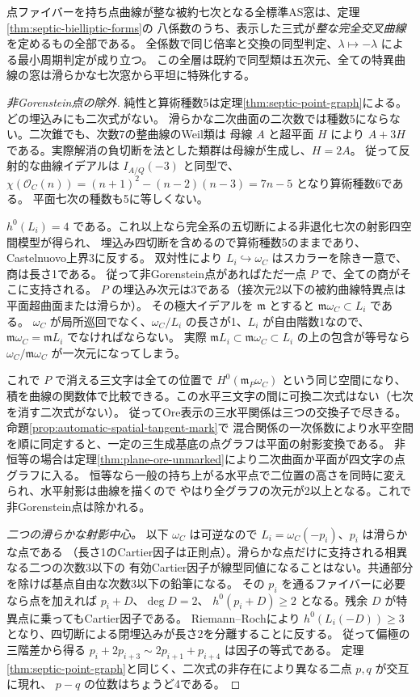 \begin{theorem}\label{thm:integral-septic-boundary}
点ファイバーを持ち点曲線が整な被約七次となる全標準AS窓は、定理\ref{thm:septic-bielliptic-forms}の
八係数のうち、表示した三式が\emph{整な完全交叉曲線}を定めるもの全部である。
全係数で同じ倍率と交換の同型判定、$\lambda\mapsto-\lambda$ による最小周期判定が成り立つ。
この全層は既約で同型類は五次元、全ての特異曲線の窓は滑らかな七次窓から平坦に特殊化する。
\end{theorem}
\begin{proof}[非Gorenstein点の除外]
純性と算術種数5は定理\ref{thm:septic-point-graph}による。どの埋込みにも二次式がない。
滑らかな二次曲面の二次数では種数5にならない。二次錐でも、次数7の整曲線のWeil類は
母線 $A$ と超平面 $H$ により $A+3H$ である。実際解消の負切断を法とした類群は母線が生成し、$H=2A$。
従って反射的な曲線イデアルは $I_{A/Q}(-3)$ と同型で、
$\chi(\mathcal O_C(n))=(n+1)^2-(n-2)(n-3)=7n-5$ となり算術種数6である。
平面七次の種数も5に等しくない。

$h^0(L_i)=4$ である。これ以上なら完全系の五切断による非退化七次の射影四空間模型が得られ、
埋込み四切断を含めるので算術種数5のままであり、Castelnuovo上界3に反する。
双対性により $L_i\hookrightarrow\omega_C$ はスカラーを除き一意で、商は長さ1である。
従って非Gorenstein点があればただ一点 $P$ で、全ての商がそこに支持される。
$P$ の埋込み次元は3である（接次元2以下の被約曲線特異点は平面超曲面または滑らか）。
その極大イデアルを $\mathfrak m$ とすると $\mathfrak m\omega_C\subset L_i$ である。
$\omega_C$ が局所巡回でなく、$\omega_C/L_i$ の長さが1、$L_i$ が自由階数1なので、
$\mathfrak m\omega_C=\mathfrak m L_i$ でなければならない。
実際 $\mathfrak mL_i\subset\mathfrak m\omega_C\subset L_i$ の上の包含が等号なら
$\omega_C/\mathfrak m\omega_C$ が一次元になってしまう。

これで $P$ で消える三文字は全ての位置で $H^0(\mathfrak m_P\omega_C)$ という同じ空間になり、
積を曲線の関数体で比較できる。この水平三文字の間に可換二次式はない（七次を消す二次式がない）。
従ってOre表示の三水平関係は三つの交換子で尽きる。命題\ref{prop:automatic-spatial-tangent-mark}で
混合関係の一次係数により水平空間を順に同定すると、一定の三生成基底の点グラフは平面の射影変換である。
非恒等の場合は定理\ref{thm:plane-ore-unmarked}により二次曲面か平面が四文字の点グラフに入る。
恒等なら一般の持ち上がる水平点で二位置の高さを同時に変えられ、水平射影は曲線を描くので
やはり全グラフの次元が2以上となる。これで非Gorenstein点は除かれる。

\smallskip
\noindent\textit{二つの滑らかな射影中心。}
以下 $\omega_C$ は可逆なので $L_i=\omega_C(-p_i)$、$p_i$ は滑らかな点である
（長さ1のCartier因子は正則点）。滑らかな点だけに支持される相異なる二つの次数3以下の
有効Cartier因子が線型同値になることはない。共通部分を除けば基点自由な次数3以下の鉛筆になる。
その $p_i$ を通るファイバーに必要なら点を加えれば $p_i+D$、$\deg D=2$、
$h^0(p_i+D)\ge2$ となる。残余 $D$ が特異点に乗ってもCartier因子である。
Riemann--Rochにより $h^0(L_i(-D))\ge3$ となり、四切断による閉埋込みが長さ2を分離することに反する。
従って偏極の三階差から得る $p_i+2p_{i+3}\sim2p_{i+1}+p_{i+4}$ は因子の等式である。
定理\ref{thm:septic-point-graph}と同じく、二次式の非存在により異なる二点 $p,q$ が交互に現れ、
$p-q$ の位数はちょうど4である。


\end{proof}
